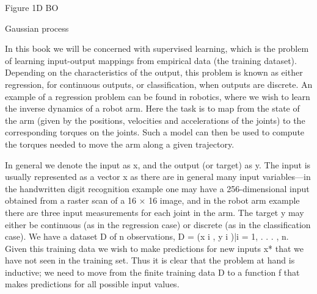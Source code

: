 Figure 1D BO


Gaussian process

In this book we will be concerned with supervised learning, which is the problem of learning input-output mappings from empirical data (the training dataset). Depending on the characteristics of the output, this problem is known as either regression, for continuous outputs, or classification, when outputs are discrete. An example of a regression problem can be found in robotics, where we wish to learn the inverse dynamics of a robot arm. Here the task is to map from the state of the arm (given by the positions, velocities and accelerations of the joints) to the corresponding torques on the joints. Such a model can then be used to compute the torques needed to move the arm along a given trajectory.

In general we denote the input as x, and the output (or target) as y. The input is usually represented as a vector x as there are in general many input variables—in the handwritten digit recognition example one may have a 256-dimensional input obtained from a raster scan of a 16 × 16 image, and in the robot arm example there are three input measurements for each joint in the arm. The target y may either be continuous (as in the regression case) or discrete (as in the classification case). We have a dataset D of n observations, D = {(x i , y i )|i = 1, . . . , n}. Given this training data we wish to make predictions for new inputs x* that we have not seen in the training set. Thus it is clear that the problem at hand is inductive; we need to move from the finite training data D to a function f that makes predictions for all possible input values.

